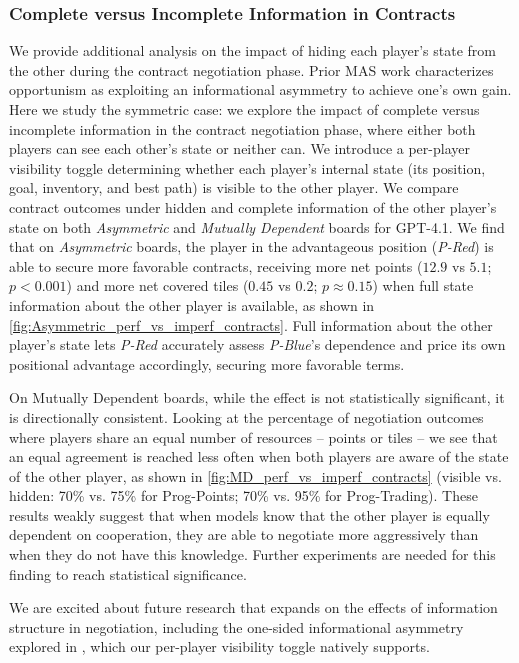 \documentclass{article} %
\newcommand{\PTC}{Prog-Trading\xspace}
\newcommand{\PPC}{Prog-Points\xspace}
\newcommand{\GPT}{GPT-4.1\xspace}
\begin{document}
\FloatBarrier

\subsubsection{Complete versus Incomplete Information in Contracts}
\label{appendix:Incomplete_info}

We provide additional analysis on the impact of hiding each player's state from the other during the contract negotiation phase. Prior MAS work \citep{luo2017opportunism} characterizes opportunism as exploiting an informational asymmetry to achieve one's own gain. Here we study the symmetric case: we explore the impact of complete versus incomplete information in the contract negotiation phase, where either both players can see each other's state or neither can. We introduce a per-player visibility toggle determining whether each player's internal state (its position, goal, inventory, and best path) is visible to the other player. We compare contract outcomes under hidden and complete information of the other player's state on both \textit{Asymmetric} and \textit{Mutually Dependent} boards for \GPT. We find that on \textit{Asymmetric} boards, the player in the advantageous position  (\textit{P-Red}) is able to secure more favorable contracts, receiving more net points ($12.9$ vs $5.1$; $p < 0.001$) and more net covered tiles ($0.45$ vs $0.2$; $p\approx0.15$) when full state information about the other player is available, as shown in \cref{fig:Asymmetric_perf_vs_imperf_contracts}. Full information about the other player's state lets \textit{P-Red} accurately assess \textit{P-Blue}'s dependence and price its own positional advantage accordingly, securing more favorable terms. 


On Mutually Dependent boards, while the effect is not statistically significant, it is directionally consistent. Looking at the percentage of negotiation outcomes where players share an equal number of resources – points or tiles – we see that an equal agreement is reached less often when both players are aware of the state of the other player, as shown in \cref{fig:MD_perf_vs_imperf_contracts} (visible vs. hidden: 70\% vs. 75\% for \PPC; 70\% vs. 95\% for \PTC). These results weakly suggest that when models know that the other player is equally dependent on cooperation, they are able to negotiate more aggressively than when they do not have this knowledge. Further experiments are needed for this finding to reach statistical significance.

We are excited about future research that expands on the effects of information structure in negotiation, including the one-sided informational asymmetry explored in \citep{luo2017opportunism}, which our per-player visibility toggle natively supports.
\end{document}

